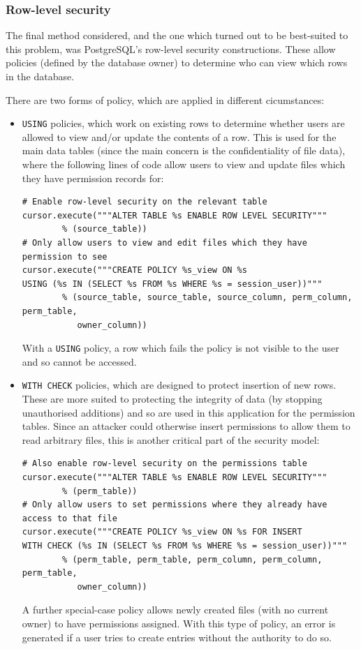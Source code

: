 \documentclass{article}
\begin{document}
\subsubsection{Row-level security}
The final method considered, and the one which turned out to be best-suited to this problem, was PostgreSQL's row-level security constructions. These allow policies (defined by the database owner) to determine who can view which rows in the database.

There are two forms of policy, which are applied in different cicumstances\cite{postgres-policy}:
\begin{itemize}
\item
  \texttt{USING} policies, which work on existing rows to determine whether users are allowed to view and/or update the contents of a row. This is used for the main data tables (since the main concern is the confidentiality of file data), where the following lines of code allow users to view and update files which they have permission records for:

\begin{verbatim}
# Enable row-level security on the relevant table
cursor.execute("""ALTER TABLE %s ENABLE ROW LEVEL SECURITY"""
        % (source_table))
# Only allow users to view and edit files which they have permission to see
cursor.execute("""CREATE POLICY %s_view ON %s
USING (%s IN (SELECT %s FROM %s WHERE %s = session_user))"""
        % (source_table, source_table, source_column, perm_column, perm_table,
           owner_column))
\end{verbatim}

  With a \texttt{USING} policy, a row which fails the policy is not visible to the user and so cannot be accessed.

\item
  \texttt{WITH CHECK} policies, which are designed to protect insertion of new rows. These are more suited to protecting the integrity of data (by stopping unauthorised additions) and so are used in this application for the permission tables. Since an attacker could otherwise insert permissions to allow them to read arbitrary files, this is another critical part of the security model:

\begin{verbatim}
# Also enable row-level security on the permissions table
cursor.execute("""ALTER TABLE %s ENABLE ROW LEVEL SECURITY"""
        % (perm_table))
# Only allow users to set permissions where they already have access to that file
cursor.execute("""CREATE POLICY %s_view ON %s FOR INSERT
WITH CHECK (%s IN (SELECT %s FROM %s WHERE %s = session_user))"""
        % (perm_table, perm_table, perm_column, perm_column, perm_table,
           owner_column))
\end{verbatim}

  A further special-case policy allows newly created files (with no current owner) to have permissions assigned. With this type of policy, an error is generated if a user tries to create entries without the authority to do so.

\end{itemize}
\end{document}
